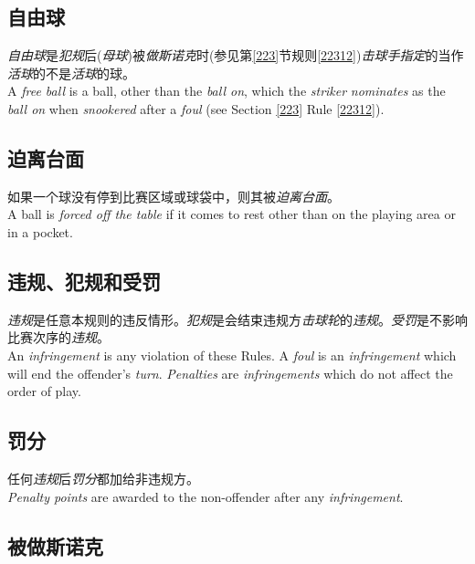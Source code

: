 \subsection{自由球}

\noindent \emph{自由球}是\emph{犯规}后(\emph{母球})被\emph{做斯诺克}时(参见第\ref{223}节规则\ref{22312})\emph{击球手}\emph{指定}的当作\emph{活球}的不是\emph{活球}的球。\\
A \emph{free ball} is a ball, other than the \emph{ball on}, which the \emph{striker} \emph{nominates} as the \emph{ball on} when \emph{snookered} after a \emph{foul} (see Section \ref{223} Rule \ref{22312}).

\subsection{迫离台面}

\noindent 如果一个球没有停到比赛区域或球袋中，则其被\emph{迫离台面}。\\
A ball is \emph{forced off the table} if it comes to rest other than on the 
playing area or in a pocket.

\subsection{违规、犯规和受罚}

\noindent \emph{违规}是任意本规则的违反情形。\emph{犯规}是会结束违规方\emph{击球轮}的\emph{违规}。\emph{受罚}是不影响比赛次序的\emph{违规}。\\
An \emph{infringement} is any violation of these Rules. A \emph{foul} is an \emph{infringement} which will end the offender's \emph{turn}. \emph{Penalties} are \emph{infringements} which do not affect the order of play. 

\subsection{罚分}

\noindent 任何\emph{违规}后\emph{罚分}都加给非违规方。\\
\emph{Penalty points} are awarded to the non-offender after any \emph{infringement}.

\subsection{被做斯诺克}\label{22217}


